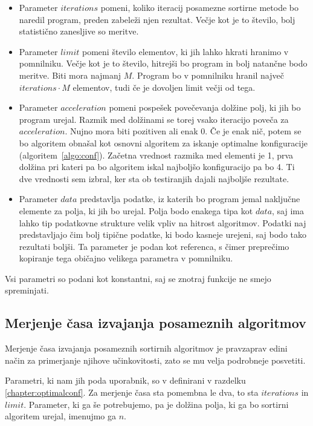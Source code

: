 \documentclass[a4paper,oneside,12pt]{article}
\begin{document}
\begin{itemize}
  \item Parameter $iterations$ pomeni, koliko iteracij posamezne sortirne metode bo naredil
    program, preden zabeleži njen rezultat. Večje kot je to število, bolj statistično
    zanesljive so meritve.
  \item Parameter $limit$ pomeni število elementov, ki jih lahko hkrati hranimo v pomnilniku.
    Večje kot je to število, hitrejši bo program in bolj natančne bodo meritve. Biti mora najmanj $M$. Program bo v
    pomnilniku hranil največ $iterations \cdot M$ elementov, tudi če je dovoljen limit večji od
    tega.
  \item Parameter $acceleration$ pomeni pospešek povečevanja dolžine polj, ki jih bo
    program urejal. Razmik med dolžinami se torej vsako iteracijo poveča za
    $acceleration$. Nujno mora biti pozitiven ali enak $0$. Če je enak nič, potem se bo
    algoritem obnašal kot osnovni algoritem za iskanje optimalne konfiguracije 
    (algoritem~\ref{algo:conf}). Začetna vrednost razmika med elementi je 1, prva dolžina
    pri kateri pa bo algoritem iskal najboljšo konfiguracijo pa bo 4. Ti dve vrednosti sem
    izbral, ker sta ob testiranjih dajali najboljše rezultate.
  \item Parameter $data$ predstavlja podatke, iz katerih bo program jemal naključne
    elemente za polja, ki jih bo urejal. Polja bodo enakega tipa kot $data$, saj ima
    lahko tip podatkovne strukture velik vpliv na hitrost algoritmov. Podatki naj
    predstavljajo čim bolj tipične podatke, ki bodo kasneje urejeni, saj bodo tako
    rezultati boljši. Ta parameter je podan kot referenca, s čimer preprečimo kopiranje
    tega običajno velikega parametra v pomnilniku.
\end{itemize}
Vsi parametri so podani kot konstantni, saj se znotraj funkcije ne smejo spreminjati. 

\subsection{Merjenje časa izvajanja posameznih algoritmov}
Merjenje časa izvajanja posameznih sortirnih algoritmov je pravzaprav edini način za
primerjanje njihove učinkovitosti, zato se mu velja podrobneje posvetiti.

Parametri, ki nam jih poda uporabnik, so v definirani v razdelku
\ref{chapter:optimalconf}. Za merjenje časa sta pomembna le dva, to sta $iterations$ in
$limit$. Parameter, ki ga še potrebujemo, pa je dolžina polja, ki ga bo sortirni algoritem
urejal, imenujmo ga $n$.
\end{document}

